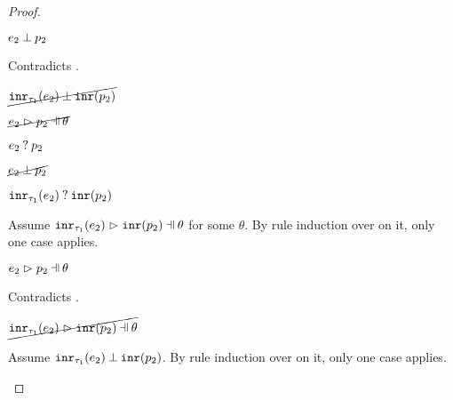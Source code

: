 \begin{proof}
\begin{byCases}
\begin{byCases}
\begin{byCases}
\begin{byCases}
                \begin{pfsteps*}
                \item $e_2 \mathbin{\bot} p_2$ 
                \end{pfsteps*}
                Contradicts .
            \end{byCases}
            \begin{pfsteps*}
            \item $\cancel{\mathtt{inr}_{\tau_1}({e_2}) \mathbin{\bot} \mathtt{inr}(p_2)}$ 
            \end{pfsteps*}
        \item[\hmaymatch{e_2}{p_2}]
            \begin{pfsteps*}
            \item $\cancel{\hpatmatch{e_2}{p_2}{\theta}}$  
            \item $e_2 \mathbin{?} p_2$  
            \item $\cancel{e_2 \mathbin{\bot} p_2}$  
            \item $\mathtt{inr}_{\tau_1}({e_2}) \mathbin{?} \mathtt{inr}(p_2)$ 
            \end{pfsteps*}
            Assume $\hpatmatch{\hinr{\tau_1}{e_2}}{\hinrp{p_2}}{\theta}$ for some $\theta$. By rule induction over  on it, only one case applies.
            \begin{byCases}
            \item[\text{(\ref{rule:MInr})}]
                \begin{pfsteps*}
                \item $\hpatmatch{e_2}{p_2}{\theta}$ 
                \end{pfsteps*}
                Contradicts .
            \end{byCases}
            \begin{pfsteps*}
            \item $\cancel{\hpatmatch{\hinr{\tau_1}{e_2}}{\hinrp{p_2}}{\theta}}$ 
            \end{pfsteps*}
            Assume $\mathtt{inr}_{\tau_1}({e_2}) \mathbin{\bot} \mathtt{inr}(p_2)$. By rule induction over  on it, only one case applies.
            \begin{byCases}

\end{byCases}
\end{byCases}
\end{byCases}
\end{byCases}
\end{proof}
